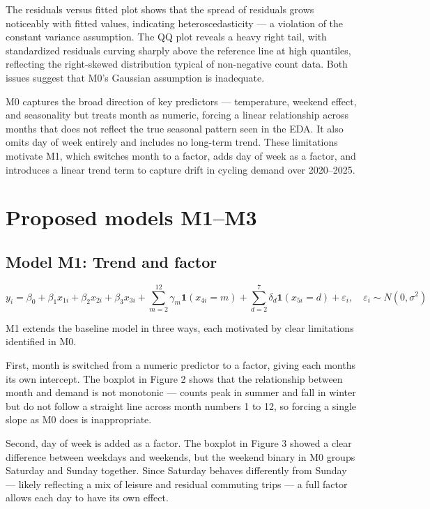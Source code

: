 \documentclass[
]{article}
\begin{document}
The residuals versus fitted plot shows that the spread of residuals
grows noticeably with fitted values, indicating heteroscedasticity --- a
violation of the constant variance assumption. The QQ plot reveals a
heavy right tail, with standardized residuals curving sharply above the
reference line at high quantiles, reflecting the right-skewed
distribution typical of non-negative count data. Both issues suggest
that M0's Gaussian assumption is inadequate.

M0 captures the broad direction of key predictors --- temperature,
weekend effect, and seasonality but treats month as numeric, forcing a
linear relationship across months that does not reflect the true
seasonal pattern seen in the EDA. It also omits day of week entirely and
includes no long-term trend. These limitations motivate M1, which
switches month to a factor, adds day of week as a factor, and introduces
a linear trend term to capture drift in cycling demand over 2020--2025.

\section{Proposed models M1--M3}\label{proposed-models-m1m3}

\subsection{Model M1: Trend and factor}\label{model-m1-trend-and-factor}

\[
y_i = \beta_0 + \beta_1 x_{1i} + \beta_2 x_{2i} + \beta_3 x_{3i} 
+ \sum_{m=2}^{12} \gamma_m \mathbf{1}(x_{4i} = m) 
+ \sum_{d=2}^{7} \delta_d \mathbf{1}(x_{5i} = d) 
+ \varepsilon_i, \quad \varepsilon_i \sim N(0, \sigma^2)
\]

M1 extends the baseline model in three ways, each motivated by clear
limitations identified in M0.

First, month is switched from a numeric predictor to a factor, giving
each months its own intercept. The boxplot in Figure 2 shows that the
relationship between month and demand is not monotonic --- counts peak
in summer and fall in winter but do not follow a straight line across
month numbers 1 to 12, so forcing a single slope as M0 does is
inappropriate.

Second, day of week is added as a factor. The boxplot in Figure 3 showed
a clear difference between weekdays and weekends, but the weekend binary
in M0 groups Saturday and Sunday together. Since Saturday behaves
differently from Sunday --- likely reflecting a mix of leisure and
residual commuting trips --- a full factor allows each day to have its
own effect.
\end{document}
